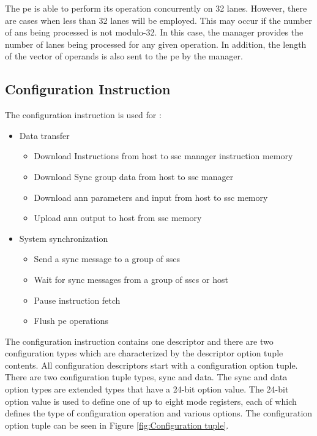 The \ac{pe} is able to perform its operation concurrently on 32 lanes. However, there are cases when less than 32 lanes will be employed. This may occur if the number of \acp{an} being processed is not modulo-32. In this case, the manager provides the number of lanes being processed for any given operation. In addition, the length of the vector of operands is also sent to the \ac{pe} by the manager.
\fi

\subsection{Configuration Instruction}
\label{sec:Configuration Instruction}

The configuration instruction is used for :
\begin{itemize}
  \lbbcleanspace
    \item Data transfer
    \begin{itemize}
      \item Download Instructions from host to \ac{ssc} manager instruction memory
      \item Download Sync group data from host to \ac{ssc} manager 
      \item Download \ac{ann} parameters and input from host to \ac{ssc} memory
      \item Upload \ac{ann} output to host from \ac{ssc} memory
    \end{itemize}
  \item System synchronization
    \begin{itemize}
      \item Send a sync message to a group of \acp{ssc}
      \item Wait for sync messages from a group of \acp{ssc} or host
      \item Pause instruction fetch
      \item Flush \ac{pe} operations
    \end{itemize}
\end{itemize}

The configuration instruction contains one descriptor and there are two configuration types which are characterized by the descriptor option tuple contents.
All configuration descriptors start with a configuration option tuple. There are two configuration tuple types, sync and data.
The sync and data option types are extended types that have a 24-bit option value.
The 24-bit option value is used to define one of up to eight mode registers, each of which defines the type of configuration operation and various options.
The configuration option tuple can be seen in Figure \ref{fig:Configuration tuple}.


